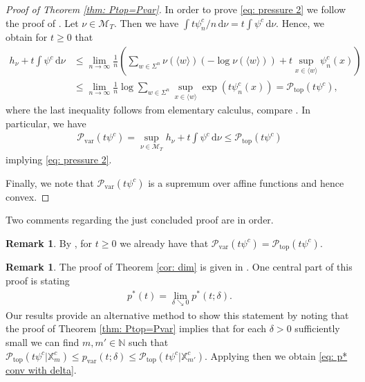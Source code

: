 \documentclass[11pt,reqno]{amsart}
\theoremstyle{plain}
\theoremstyle{definition}
\newtheorem{remark}[theorem]{Remark}
\newcommand{\N}{{\mathbb N}}
\newcommand{\X}{{\mathbb X}}
\begin{document}
\begin{proof}[Proof of Theorem \ref{thm: Ptop=Pvar}]
In order to prove \eqref{eq: pressure 2} we follow the proof of \cite[Prop.~1.21]{Bow}.
Let $\nu\in \mathcal{M}_T$. Then we have 
$\int t\psi_n^c/n \,\mathrm{d}\nu = t\int \psi^c\, \mathrm{d}\nu$. Hence, we obtain for $t\geqslant 0$ that
\begin{align*}
h_{\nu} + t\int \psi^{c}\, \mathrm{d}\nu
 &\leqslant \lim_{n\to\infty} \frac{1}{n}\left(\sum_{w\in \Sigma^n} \nu(\langle w \rangle)(-\log \nu(\langle w \rangle))+t \sup_{x\in \langle w \rangle} \psi_n^{c}(x) \right)\\
 &\leqslant \lim_{n\to\infty} \frac{1}{n}\log \sum_{w\in \Sigma^n}\sup_{x\in \langle w \rangle}\exp(t\psi_n^{c}(x))=\mathcal{P}_{\operatorname {top}}(t\psi^{c}),
\end{align*}
where the last inequality follows from elementary calculus, compare \cite[Lem.~1.1]{Bow}.
In particular, we have 
\begin{align*}
 \mathcal{P}_{\operatorname {var}}(t\psi^{c})
 =\sup_{\nu\in \mathcal{M}_T}h_{\nu} + t\int \psi^{c}\, \mathrm{d}\nu\leqslant \mathcal{P}_{\operatorname {top}}(t\psi^{c})
 \end{align*}
implying \eqref{eq: pressure 2}. 

Finally, we note that $\mathcal{P}_{\operatorname{var}}\left(t\psi^{c}\right)$ is a supremum over affine functions and hence convex.
\end{proof}

Two comments regarding the just concluded proof are in order.

\begin{remark}
By \cite[Thm.~4.4.11]{keller}, for $t\geqslant 0$ we already have that $\mathcal{P}_{\operatorname{var}}\left(t\psi^{c}\right)=\mathcal{P}_{\operatorname{top}}\left(t\psi^{c}\right)$. 
\end{remark}





\begin{remark}\label{rem: proof of FSSthm}
 The proof of Theorem \ref{cor: dim} is given in \cite[Sec.~6]{fan_generalized_2020}. One central part of this proof is \cite[Prop.~6.4]{fan_generalized_2020} stating 
 \begin{align}
   p^*(t) = \lim_{\delta\searrow 0} p^*(t; \delta).\label{eq: p* conv with delta}
 \end{align}
Our results provide an alternative method to show this statement by noting that 
  the proof of Theorem \ref{thm: Ptop=Pvar} implies that for each $\delta>0$ sufficiently small we can find $m, m'\in\N$ such that $\mathcal{P}_{\operatorname{top}}\left(t\psi^{c}\lvert \X_m^{c}\right)\leqslant p_{\operatorname{var}}(t;\delta)\leqslant \mathcal{P}_{\operatorname{top}}\left(t\psi^{c}\lvert \X_{m'}^{c}\right)$. Applying then \cite[Prop.~4.1]{MR2719683} we obtain \eqref{eq: p* conv with delta}.
\end{remark}
\end{document}
